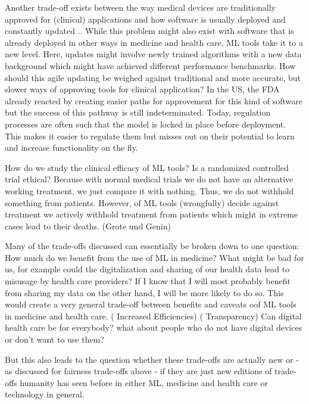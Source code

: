 Another trade-off exists between the way medical devices are traditionally approved for (clinical) applications and how software is usually deployed and constantly updated \cite{he2019practical}.. While this problem might also exist with software that is already deployed in other ways in medicine and health care, ML tools take it to a new level. Here, updates might involve newly trained algorithms with a new data background which might have achieved different performance benchmarks. How should this agile updating be weighed against traditional and more accurate, but slower ways of approving tools for clinical application? In the US, the FDA already reacted by creating easier paths for approvement for this kind of software but the success of this pathway is still indeterminated.
Today, regulation processes are often such that the model is locked in place before deployment. This makes it easier to regulate them but misses out on their potential to learn and increase functionality on the fly. 

How do we study the clinical efficacy of ML tools? Is a randomized controlled trial ethical? Because with normal medical trials we do not have an alternative working treatment, we just compare it with nothing. Thus, we do not withhold something from patients. However, of ML tools (wrongfully) decide against treatment we actively withhold treatment from patients which might in extreme cases lead to their deaths. (Grote und Genin)


 Many of the trade-offs discussed can essentially be broken down to one question: How much do we benefit from the use of ML in medicine? What might be bad for us, for example could the digitalization and sharing of our health data lead to misusage by health care providers? If I know that I will most probably benefit from sharing my data on the other hand, I will be more likely to do so. This would create a very general trade-off between benefits and caveats oof ML tools in medicine and health care. (\cite{topol2019high} Increased Efficiencies) (\cite{he2019practical} Transparency)
Can digital health care be for everybody? what about people who do not have digital devices or don't want to use them?

But this also leads to the question whether these trade-offs are actually new or - as discussed for fairness trade-offs above - if they are just new editions of trade-offs humanity has seen before in either ML, medicine and health care or technology in general.

